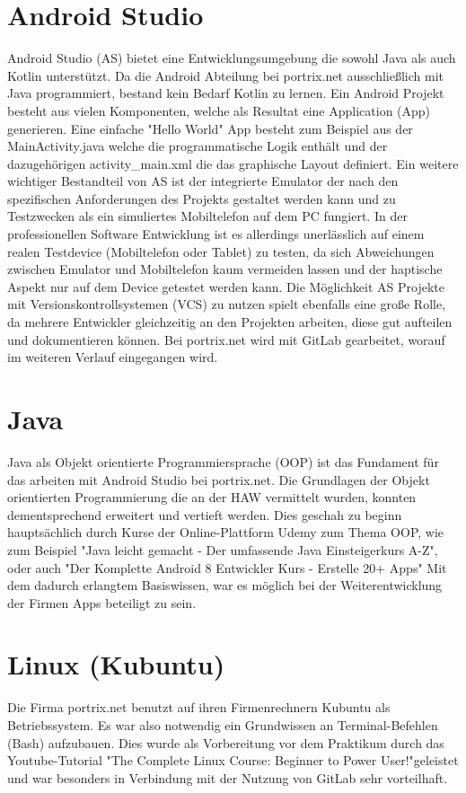 \section{Android Studio}
Android Studio (AS) bietet eine Entwicklungsumgebung die sowohl Java als auch Kotlin unterst\"utzt. Da die Android Abteilung bei portrix.net ausschlie\ss{}lich mit Java programmiert, bestand kein Bedarf Kotlin zu lernen.
Ein Android Projekt besteht aus vielen Komponenten, welche als Resultat eine Application (App) generieren. Eine einfache "Hello World" App besteht zum Beispiel aus der MainActivity.java welche die programmatische Logik enth\"alt und der dazugeh\"origen activity\_main.xml die das graphische Layout definiert.
Ein weitere wichtiger Bestandteil von AS ist der integrierte Emulator der nach den spezifischen Anforderungen des Projekts gestaltet werden kann und zu Testzwecken als ein simuliertes Mobiltelefon auf dem PC fungiert. In der professionellen Software Entwicklung ist es allerdings unerl\"asslich auf einem realen Testdevice (Mobiltelefon oder Tablet) zu testen, da sich Abweichungen zwischen Emulator und Mobiltelefon kaum vermeiden lassen und der haptische Aspekt nur auf dem Device getestet werden kann.
Die M\"oglichkeit AS Projekte mit Versionskontrollsystemen (VCS) zu nutzen spielt ebenfalls eine gro\ss{}e Rolle, da mehrere Entwickler gleichzeitig an den Projekten arbeiten, diese gut aufteilen und dokumentieren k\"onnen. Bei portrix.net wird mit GitLab gearbeitet, worauf im weiteren Verlauf eingegangen wird.

\section{Java}
Java als Objekt orientierte Programmiersprache (OOP) ist das Fundament f\"ur das arbeiten mit Android Studio bei portrix.net. Die Grundlagen der Objekt orientierten Programmierung die an der HAW vermittelt wurden, konnten dementsprechend erweitert und vertieft werden. Dies geschah zu beginn haupts\"achlich durch Kurse der Online-Plattform Udemy zum Thema OOP, wie zum Beispiel "Java leicht gemacht - Der umfassende Java Einsteigerkurs A-Z", oder 
auch "Der Komplette Android 8 Entwickler Kurs - Erstelle 20+ Apps" 
Mit dem dadurch erlangtem Basiswissen, war es m\"oglich bei der Weiterentwicklung der Firmen Apps beteiligt zu sein.

\section{Linux (Kubuntu)}
Die Firma portrix.net benutzt auf ihren Firmenrechnern Kubuntu als Betriebssystem. Es war also notwendig ein Grundwissen an Terminal-Befehlen (Bash) aufzubauen. Dies wurde als Vorbereitung vor dem Praktikum durch das Youtube-Tutorial "The Complete Linux Course: Beginner to Power User!"\footnotemark geleistet und war besonders in Verbindung mit der Nutzung von GitLab sehr vorteilhaft.  

